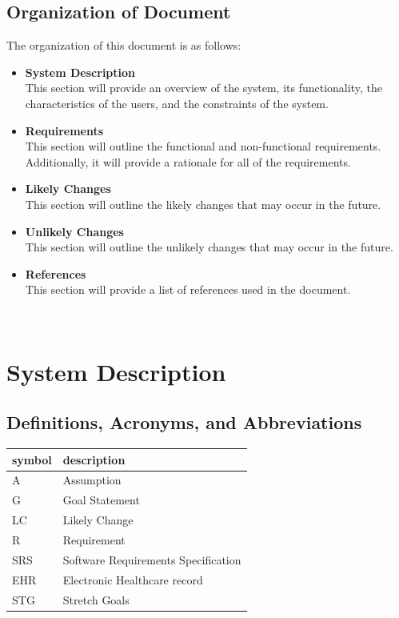 \documentclass[12pt]{article}
\begin{document}
\subsection{Organization of Document}
The organization of this document is as follows:
\begin{itemize}
  \item \textbf{System Description}\\
  This section will provide an overview of the system, its functionality, the characteristics of the users, and the constraints of the system.
  \item \textbf{Requirements}\\
  This section will outline the functional and non-functional requirements. Additionally, it will provide a rationale for all of the requirements.
  \item \textbf{Likely Changes}\\
  This section will outline the likely changes that may occur in the future.
  \item \textbf{Unlikely Changes}\\
  This section will outline the unlikely changes that may occur in the future.
  \item \textbf{References}\\
  This section will provide a list of references used in the document.

\end{itemize}

~\newpage

\section{System Description}

\subsection{Definitions, Acronyms, and Abbreviations}

\begin{tabular}{l l} 
  \toprule    
  \textbf{symbol} & \textbf{description}\\
  \midrule 
  A & Assumption\\
  G & Goal Statement\\
  LC & Likely Change\\
  R & Requirement\\
  SRS & Software Requirements Specification\\
  EHR & Electronic Healthcare record\\
  STG & Stretch Goals\\
  \bottomrule
\end{tabular}\\
\end{document}
